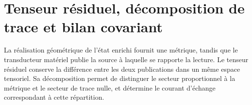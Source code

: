 %

\section{Tenseur résiduel, décomposition de trace et bilan covariant}
\label{vii:vii:sec:tensor-residual-balance}

La réalisation géométrique de l'état enrichi fournit une métrique, tandis que le transducteur matériel publie la source à laquelle se rapporte la lecture. Le tenseur résiduel conserve la différence entre les deux publications dans un même espace tensoriel. Sa décomposition permet de distinguer le secteur proportionnel à la métrique et le secteur de trace nulle, et détermine le courant d'échange correspondant à cette répartition.

